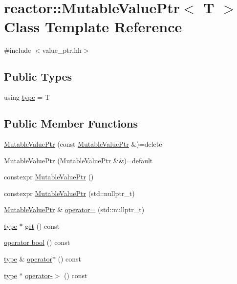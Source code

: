 \hypertarget{classreactor_1_1MutableValuePtr}{}\section{reactor\+:\+:Mutable\+Value\+Ptr$<$ T $>$ Class Template Reference}
\label{classreactor_1_1MutableValuePtr}


{\ttfamily \#include $<$value\+\_\+ptr.\+hh$>$}

\subsection*{Public Types}
\begin{DoxyCompactItemize}
\item 
using \hyperlink{classreactor_1_1MutableValuePtr_a6dfaa60279549db876d8ea8b1135b46a}{type} = T
\end{DoxyCompactItemize}
\subsection*{Public Member Functions}
\begin{DoxyCompactItemize}
\item 
\hyperlink{classreactor_1_1MutableValuePtr_a57b5bbf2f04f30649ed7629400cfc962}{Mutable\+Value\+Ptr} (const \hyperlink{classreactor_1_1MutableValuePtr}{Mutable\+Value\+Ptr} \&)=delete
\item 
\hyperlink{classreactor_1_1MutableValuePtr_a309629a23ff5d3c5d462a26fbf5bb2bf}{Mutable\+Value\+Ptr} (\hyperlink{classreactor_1_1MutableValuePtr}{Mutable\+Value\+Ptr} \&\&)=default
\item 
constexpr \hyperlink{classreactor_1_1MutableValuePtr_ac12cb01a82f7c7f4d5097d76713a7a42}{Mutable\+Value\+Ptr} ()
\item 
constexpr \hyperlink{classreactor_1_1MutableValuePtr_a74f7e76c461da95e9215be4e5ae9704b}{Mutable\+Value\+Ptr} (std\+::nullptr\+\_\+t)
\item 
\hyperlink{classreactor_1_1MutableValuePtr}{Mutable\+Value\+Ptr} \& \hyperlink{classreactor_1_1MutableValuePtr_ace0a7bdb60d0da1c13726522485fbe98}{operator=} (std\+::nullptr\+\_\+t)
\item 
\hyperlink{classreactor_1_1MutableValuePtr_a6dfaa60279549db876d8ea8b1135b46a}{type} $\ast$ \hyperlink{classreactor_1_1MutableValuePtr_ad379c13d736742a08f8b1f31cb9d4426}{get} () const
\item 
\hyperlink{classreactor_1_1MutableValuePtr_a334c0a48458c92a312a02bb7993f221a}{operator bool} () const
\item 
\hyperlink{classreactor_1_1MutableValuePtr_a6dfaa60279549db876d8ea8b1135b46a}{type} \& \hyperlink{classreactor_1_1MutableValuePtr_aed84a12ae50d8c549b021967b375b85d}{operator$\ast$} () const
\item 
\hyperlink{classreactor_1_1MutableValuePtr_a6dfaa60279549db876d8ea8b1135b46a}{type} $\ast$ \hyperlink{classreactor_1_1MutableValuePtr_a67d119e3f850a5384589bbdbd00eb899}{operator-\/$>$} () const
\end{DoxyCompactItemize}
